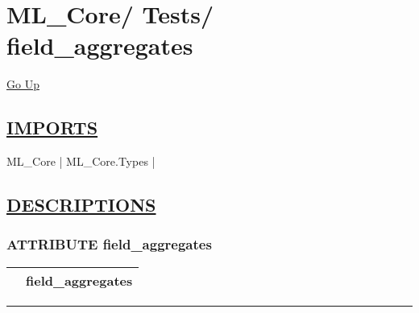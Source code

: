 \chapter*{\color{headfile}
{\large ML\_Core\slash\hspace{0pt}}
{\large Tests\slash\hspace{0pt}}
 \\
field_aggregates
}
\hypertarget{ecldoc:toc:ML_Core.Tests.field_aggregates}{}
\hyperlink{ecldoc:toc:root/ML_Core/Tests}{Go Up}

\section*{\underline{\textsf{IMPORTS}}}
\begin{doublespace}
{\large
ML\_Core |
ML\_Core.Types |
}
\end{doublespace}

\section*{\underline{\textsf{DESCRIPTIONS}}}
\subsection*{\textsf{\colorbox{headtoc}{\color{white} ATTRIBUTE}
field\_aggregates}}

\hypertarget{ecldoc:ml_core.tests.field_aggregates}{}

{\renewcommand{\arraystretch}{1.5}
\begin{tabularx}{\textwidth}{|>{\raggedright\arraybackslash}l|X|}
\hline
\hspace{0pt}\mytexttt{\color{red} } & \textbf{field\_aggregates} \\
\hline
\end{tabularx}
}

\par


\rule{\linewidth}{0.5pt}
